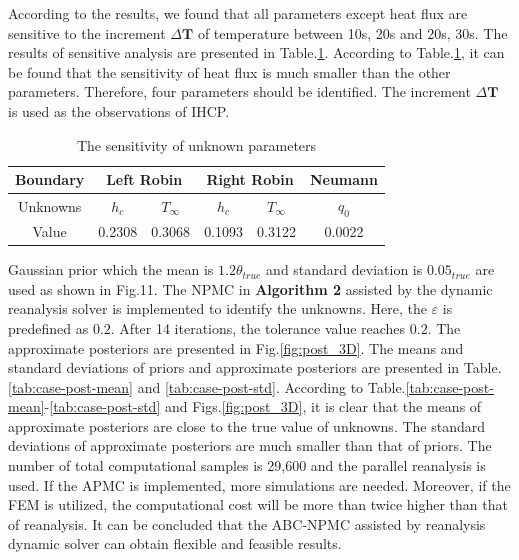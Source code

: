 \documentclass[review]{elsarticle}
\begin{document}
According to the results, we found that all parameters except heat flux are sensitive to the increment $\Delta \mathbf{T}$  of temperature between 10s, 20s and 20s, 30s. The results of sensitive analysis are presented in Table.\ref{tab:case2-sensitive}. According to Table.\ref{tab:case2-sensitive}, it can be found that the sensitivity of heat flux is much smaller than the other parameters. Therefore, four parameters should be identified. The increment  $\Delta \mathbf{T}$ is used as the observations of IHCP.

\begin{table}[]
    \centering
    \caption{The sensitivity of unknown parameters}
    \begin{tabular}{c c c c c c}
        \hline
         Boundary &  \multicolumn{2}{c}{ Left Robin } & \multicolumn{2}{c}{Right Robin } & Neumann \\
         \hline
         Unknowns &  $h_c$ & $T_\infty$ & $h_c$ & $T_\infty$ & $q_0$\\
         Value  &  0.2308 & 0.3068 & 0.1093 & 0.3122 & 0.0022\\
         \hline
    \end{tabular}
    \label{tab:case2-sensitive}
\end{table}

Gaussian prior which the mean is $1.2\theta_{true}$ and standard deviation is $0.05_{true}$ are used as shown in Fig.11. 
The NPMC in \textbf{Algorithm 2} assisted by the dynamic reanalysis solver is implemented to identify the unknowns. Here, the $\varepsilon$ is predefined as $0.2$. After 14 iterations, the tolerance value reaches $0.2$. The approximate posteriors are presented in Fig.\ref{fig:post_3D}. The means and standard deviations of priors and approximate posteriors are presented in Table.\ref{tab:case-post-mean} and \ref{tab:case-post-std}. According to Table.\ref{tab:case-post-mean}-\ref{tab:case-post-std} and Figs.\ref{fig:post_3D}, it is clear that the means of approximate posteriors are close to the true value of unknowns. The standard deviations of approximate posteriors are much smaller than that of priors. The number of total computational samples is 29,600 and the parallel reanalysis \cite{wang2013parallel} is used. If the APMC is implemented, more simulations are needed. Moreover, if the FEM is utilized, the computational cost will be more than twice higher than that of reanalysis. It can be concluded that the ABC-NPMC assisted by reanalysis dynamic solver can obtain flexible and feasible results.
\end{document}
